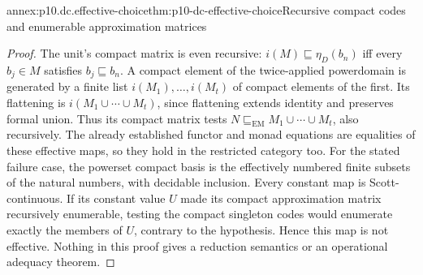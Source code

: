 \begin{annexitem}{annex:p10.dc.effective-choice}{thm:p10-dc-effective-choice}{Recursive compact codes and enumerable approximation matrices}
\begin{proof}
The unit's compact matrix is even recursive:
\(i(M)\sqsubseteq\eta_D(b_n)\) iff every \(b_j\in M\) satisfies
\(b_j\sqsubseteq b_n\). A compact element of the twice-applied
powerdomain is generated by a finite list
\(i(M_1),\ldots,i(M_t)\) of compact elements of the first.
Its flattening is \(i(M_1\cup\cdots\cup M_t)\), since flattening
extends identity and preserves formal union. Thus its compact matrix
tests \(N\sqsubseteq_{\mathrm{EM}}M_1\cup\cdots\cup M_t\), also
recursively. The already established functor and monad equations are
equalities of these effective maps, so they hold in the restricted
category too. For the stated failure case, the powerset compact basis is
the effectively numbered finite subsets of the natural numbers, with
decidable inclusion. Every constant map is Scott-continuous. If its
constant value \(U\) made its compact approximation matrix recursively
enumerable, testing the compact singleton codes would enumerate exactly
the members of \(U\), contrary to the hypothesis. Hence this map is
not effective. Nothing in this proof gives a reduction semantics or an
operational adequacy theorem.
\end{proof}
\end{annexitem}
